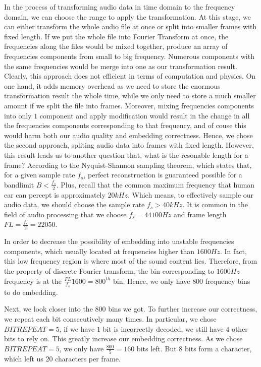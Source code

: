In the process of transforming audio data in time domain to the frequency domain, we can choose the range to apply the transformation. At this stage, we can either transform the whole audio file at once or split into smaller frames with fixed length. If we put the whole file into Fourier Transform at once, the frequencies along the files would be mixed together, produce an array of frequencies components from small to big frequency. Numerous components with the same frequencies would be merge into one as our transformation result. Clearly, this approach does not efficient in terms of computation and physics. On one hand, it adds memory overhead as we need to store the enormous transformation result the whole time, while we only need to store a much smaller amount if we split the file into frames. Moreover, mixing frequencies components into only \(1\) component and apply modification would result in the change in all the frequencies components corresponding to that frequency, and of couse this would harm both our audio quality and embedding correctness. Hence, we chose the second approach, spliting audio data into frames with fixed length. However, this result leads us to another question that, what is the resonable length for a frame? 
According to the Nyquist-Shannon sampling theorem, which states that, for a given sample rate \(f_s\), perfect reconstruction is guaranteed possible for a bandlimit \(B<\frac{f_s}{2}\). Plus, recall that the common maximum frequency that human ear can percept is approximately \(20kHz\). Which means, to effectively sample our audio data, we should choose the sample rate \(f_s>40kHz\). It is common in the field of audio processing that we choose \(f_s=44100Hz\) and frame length \(FL=\frac{f_s}{2}=22050\). 

In order to decrease the possibility of embedding into unstable frequencies components, which usually located at frequencies higher than \(1600Hz\). In fact, this low frequency region is where most of the sound content lies. Therefore, from the property of discrete Fourier transform, the bin corresponding to \(1600Hz\) frequency is at the \(\frac{FL}{f_s}1600=800^{th}\) bin. Hence, we only have \(800\) frequency bins to do embedding.

Next, we look closer into the \(800\) bins we got. To further increase our correctness, we repeat each bit consecutively many times. In particular, we chose \(BITREPEAT=5\), if we have \(1\) bit is incorrectly decoded, we still have \(4\) other bits to rely on. This greatly increase our embedding correctness. As we chose \(BITREPEAT=5\), we only have \(\frac{800}{5}=160\) bits left. But \(8\) bits form a character, which left us \(20\) characters per frame. 
